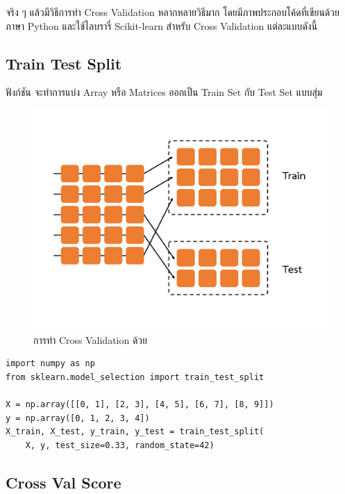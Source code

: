 จริง ๆ แล้วมีวิธีการทำ Cross Validation หลากหลายวิธีมาก โดยมีภาพประกอบโค้ดที่เขียนด้วยภาษา Python และใช้ไลบรารี่ Scikit-learn 
สำหรับ Cross Validation แต่ละแบบดังนี้

\subsection{Train Test Split}
\label{ssec:train_test_split}

ฟังก์ชัน  จะทำการแบ่ง Array หรือ Matrices ออกเป็น Train Set กับ Test Set แบบสุ่ม

\begin{figure}[H]
    \centering
    \includegraphics[width=0.9\linewidth,page=1]{fig/cross_validation.pdf}
    \caption{การทำ Cross Validation ด้วย }
    \label{fig:train_test_split}
\end{figure}

\begin{lstlisting}[style=MyPython]
import numpy as np
from sklearn.model_selection import train_test_split

X = np.array([[0, 1], [2, 3], [4, 5], [6, 7], [8, 9]])
y = np.array([0, 1, 2, 3, 4])
X_train, X_test, y_train, y_test = train_test_split(
    X, y, test_size=0.33, random_state=42)
\end{lstlisting}

\subsection{Cross Val Score}
\label{ssec:cross_val_score}

